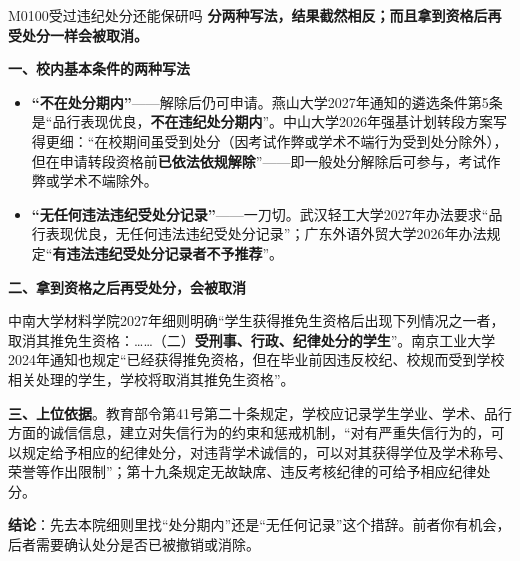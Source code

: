 \begin{qa}{M0100}{受过违纪处分还能保研吗}
\textbf{分两种写法，结果截然相反；而且拿到资格后再受处分一样会被取消。}

\textbf{一、校内基本条件的两种写法}

\begin{itemize}
  \item \textbf{“不在处分期内”}——解除后仍可申请。燕山大学2027年通知的遴选条件第5条是“品行表现优良，\textbf{不在违纪处分期内}”。中山大学2026年强基计划转段方案写得更细：“在校期间虽受到处分（因考试作弊或学术不端行为受到处分除外），但在申请转段资格前\textbf{已依法依规解除}”——即一般处分解除后可参与，考试作弊或学术不端除外。
  \item \textbf{“无任何违法违纪受处分记录”}——一刀切。武汉轻工大学2027年办法要求“品行表现优良，无任何违法违纪受处分记录”；广东外语外贸大学2026年办法规定“\textbf{有违法违纪受处分记录者不予推荐}”。
\end{itemize}

\textbf{二、拿到资格之后再受处分，会被取消}

中南大学材料学院2027年细则明确“学生获得推免生资格后出现下列情况之一者，取消其推免生资格：……（二）\textbf{受刑事、行政、纪律处分的学生}”。南京工业大学2024年通知也规定“已经获得推免资格，但在毕业前因违反校纪、校规而受到学校相关处理的学生，学校将取消其推免生资格”。

\textbf{三、上位依据}。教育部令第41号第二十条规定，学校应记录学生学业、学术、品行方面的诚信信息，建立对失信行为的约束和惩戒机制，“对有严重失信行为的，可以规定给予相应的纪律处分，对违背学术诚信的，可以对其获得学位及学术称号、荣誉等作出限制”；第十九条规定无故缺席、违反考核纪律的可给予相应纪律处分。

\textbf{结论}：先去本院细则里找“处分期内”还是“无任何记录”这个措辞。前者你有机会，后者需要确认处分是否已被撤销或消除。
\end{qa}


